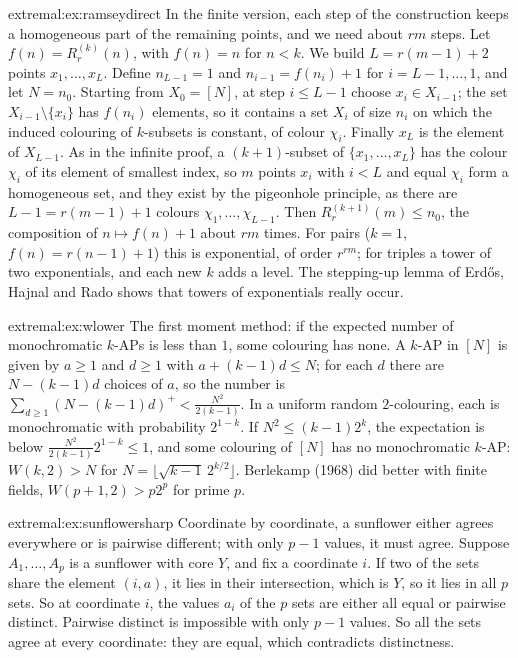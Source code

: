 \begin{solution}{extremal:ex:ramseydirect}
\idea In the finite version, each step of the construction keeps a homogeneous part of the remaining points, and we need about $rm$ steps.
\writeup Let $f(n)=R^{(k)}_r(n)$, with $f(n)=n$ for $n<k$. We build $L=r(m-1)+2$ points $x_1,\dots,x_L$. Define $n_{L-1}=1$ and
$n_{i-1}=f(n_i)+1$ for $i=L-1,\dots,1$, and let $N=n_0$. Starting from $X_0=[N]$, at step $i\le L-1$ choose $x_i\in X_{i-1}$; the set $X_{i-1}\setminus\{x_i\}$ has $f(n_i)$ elements, so it contains a set $X_i$ of
size $n_i$ on which the induced colouring of $k$-subsets is constant, of colour $\chi_i$. Finally $x_L$ is the element of $X_{L-1}$. As in the infinite proof, a $(k+1)$-subset of $\{x_1,\dots,x_L\}$ has the colour
$\chi_i$ of its element of smallest index, so $m$ points $x_i$ with $i<L$ and equal $\chi_i$ form a homogeneous set, and they exist by the pigeonhole principle, as there are $L-1=r(m-1)+1$ colours $\chi_1,\dots,\chi_{L-1}$. Then $R^{(k+1)}_r(m)\le n_0$, the composition of $n\mapsto f(n)+1$ about $rm$ times. For pairs ($k=1$, $f(n)=r(n-1)+1$) this is exponential, of order $r^{rm}$; for triples a
tower of two exponentials, and each new $k$ adds a level. The stepping-up lemma of Erd\H os, Hajnal and Rado shows that towers of exponentials really occur.
\end{solution}

\begin{solution}{extremal:ex:wlower}
\idea The first moment method: if the expected number of monochromatic $k$-APs is less than $1$, some colouring has none.
\writeup A $k$-AP in $[N]$ is given by $a\ge1$ and $d\ge1$ with $a+(k-1)d\le N$; for each $d$ there are $N-(k-1)d$ choices of $a$, so the number is $\sum_{d\ge1}(N-(k-1)d)^+<\frac{N^2}{2(k-1)}$. In a uniform random
$2$-colouring, each is monochromatic with probability $2^{1-k}$. If $N^2\le(k-1)2^k$, the expectation is below $\frac{N^2}{2(k-1)}2^{1-k}\le1$, and some colouring of $[N]$ has no monochromatic $k$-AP:
$W(k,2)>N$ for $N=\lfloor\sqrt{k-1}\,2^{k/2}\rfloor$. Berlekamp (1968) did better with finite fields, $W(p+1,2)>p2^p$ for prime $p$.
\end{solution}

\begin{solution}{extremal:ex:sunflowersharp}
\idea Coordinate by coordinate, a sunflower either agrees everywhere or is pairwise different; with only $p-1$ values, it must agree.
\writeup Suppose $A_1,\dots,A_p$ is a sunflower with core $Y$, and fix a coordinate $i$. If two of the sets share the element $(i,a)$, it lies in their intersection, which is $Y$, so it lies in all $p$ sets. So at
coordinate $i$, the values $a_i$ of the $p$ sets are either all equal or pairwise distinct. Pairwise distinct is impossible with only $p-1$ values. So all the sets agree at every coordinate: they are equal,
which contradicts distinctness.
\end{solution}

